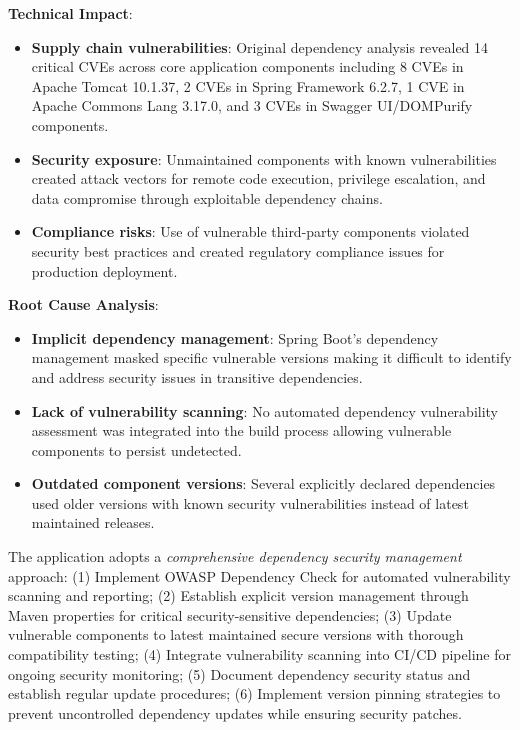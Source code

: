 \documentclass[]{UCD_CS_FYP_Report}
\begin{document}
\textbf{Technical Impact}: 
\begin{itemize}
	\item \textbf{Supply chain vulnerabilities}: Original dependency analysis revealed 14 critical CVEs across core application components including 8 CVEs in Apache Tomcat 10.1.37, 2 CVEs in Spring Framework 6.2.7, 1 CVE in Apache Commons Lang 3.17.0, and 3 CVEs in Swagger UI/DOMPurify components.
	\item \textbf{Security exposure}: Unmaintained components with known vulnerabilities created attack vectors for remote code execution, privilege escalation, and data compromise through exploitable dependency chains.
	\item \textbf{Compliance risks}: Use of vulnerable third-party components violated security best practices and created regulatory compliance issues for production deployment.
\end{itemize}

\textbf{Root Cause Analysis}: 
\begin{itemize}
	\item \textbf{Implicit dependency management}: Spring Boot's dependency management masked specific vulnerable versions making it difficult to identify and address security issues in transitive dependencies.
	\item \textbf{Lack of vulnerability scanning}: No automated dependency vulnerability assessment was integrated into the build process allowing vulnerable components to persist undetected.
	\item \textbf{Outdated component versions}: Several explicitly declared dependencies used older versions with known security vulnerabilities instead of latest maintained releases.
\end{itemize}

The application adopts a \textit{comprehensive dependency security management} approach: (1) Implement OWASP Dependency Check for automated vulnerability scanning and reporting; (2) Establish explicit version management through Maven properties for critical security-sensitive dependencies; (3) Update vulnerable components to latest maintained secure versions with thorough compatibility testing; (4) Integrate vulnerability scanning into CI/CD pipeline for ongoing security monitoring; (5) Document dependency security status and establish regular update procedures; (6) Implement version pinning strategies to prevent uncontrolled dependency updates while ensuring security patches.
\end{document}
